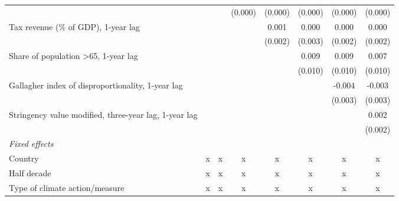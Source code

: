 \begin{tabular}{lccccccc}
                                                                      &                &               & (0.000)        & (0.000)       & (0.000)       & (0.000)       & (0.000)\\   
   Tax revenue (\% of GDP), 1-year lag                                &                &               &                & 0.001         & 0.000         & 0.000         & 0.000\\   
                                                                      &                &               &                & (0.002)       & (0.003)       & (0.002)       & (0.002)\\   
   Share of population >65, 1-year lag                                &                &               &                &               & 0.009         & 0.009         & 0.007\\   
                                                                      &                &               &                &               & (0.010)       & (0.010)       & (0.010)\\   
   Gallagher index of disproportionality, 1-year lag                  &                &               &                &               &               & -0.004        & -0.003\\   
                                                                      &                &               &                &               &               & (0.003)       & (0.003)\\   
   Stringency value modified, three-year lag, 1-year lag              &                &               &                &               &               &               & 0.002\\   
                                                                      &                &               &                &               &               &               & (0.002)\\   
   \emph{Fixed effects}\\
   Country                                                            & x              & x             & x              & x             & x             & x             & x\\  
   Half decade                                                        & x              & x             & x              & x             & x             & x             & x\\  
   Type of climate action/measure                                     & x              & x             & x              & x             & x             & x             & x\\  

\end{tabular}
